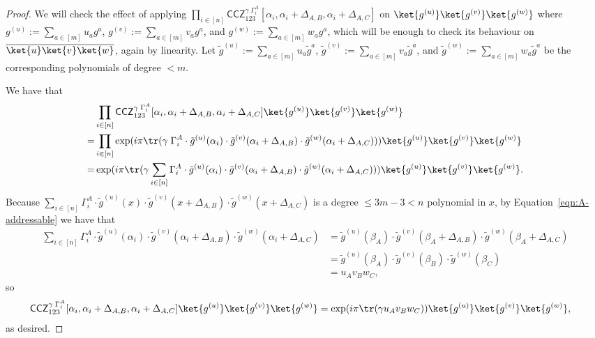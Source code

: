 \documentclass[11pt]{article}
\theoremstyle{definition}
\renewcommand{\le}{\leqslant}
\newcommand{\CCZ}{\mathsf{CCZ}}
\newcommand*{\ol}{\overline}
\begin{document}
\begin{proof}
    We will check the effect of applying $\prod_{i \in [n]}\CCZ_{123}^{\gamma\;\Gamma^A_i}[\alpha_i, \alpha_i + \Delta_{A,B}, \alpha_i + \Delta_{A,C}]$ on $\ket{g^{(u)}}\ket{g^{(v)}}\ket{g^{(w)}}$ where $g^{(u)} := \sum_{a \in [m]} u_a g^a$, $g^{(v)} := \sum_{a \in [m]} v_a g^a$, and $g^{(w)} := \sum_{a \in [m]} w_a g^a$, which will be enough to check its behaviour on $\ol{\ket{u}}\ol{\ket{v}}\ol{\ket{w}}$, again by linearity. Let $\tilde{g}^{(u)} := \sum_{a \in [m]} u_a \tilde{g}^a$, $\tilde{g}^{(v)} := \sum_{a \in [m]} v_a \tilde{g}^a$, and $\tilde{g}^{(w)} := \sum_{a \in [m]} w_a \tilde{g}^a$ be the corresponding polynomials of degree $< m$.

    We have that
    \begin{align}
        &\prod_{i \in [n]}\CCZ_{123}^{\gamma\;\Gamma^A_i}[\alpha_i, \alpha_i + \Delta_{A,B}, \alpha_i + \Delta_{A,C}] \ket{g^{(u)}}\ket{g^{(v)}}\ket{g^{(w)}} \\
        = &\prod_{i \in [n]} \exp({i\pi\tr(\gamma\;\Gamma^A_i \cdot \tilde{g}^{(u)}(\alpha_i) \cdot \tilde{g}^{(v)}(\alpha_i + \Delta_{A,B}) \cdot \tilde{g}^{(w)}(\alpha_i + \Delta_{A,C}) )}) \ket{g^{(u)}}\ket{g^{(v)}}\ket{g^{(w)}} \\
        = &\exp({i\pi\tr(\gamma\sum_{i \in [n]} \Gamma^A_i \cdot \tilde{g}^{(u)}(\alpha_i) \cdot \tilde{g}^{(v)}(\alpha_i + \Delta_{A,B}) \cdot \tilde{g}^{(w)}(\alpha_i + \Delta_{A,C}) )}) \ket{g^{(u)}}\ket{g^{(v)}}\ket{g^{(w)}}.
    \end{align}
Because $\sum_{i \in [n]} \Gamma^A_i \cdot \tilde{g}^{(u)}(x) \cdot \tilde{g}^{(v)}(x + \Delta_{A,B}) \cdot \tilde{g}^{(w)}(x + \Delta_{A,C})$ is a degree $\le 3m-3 < n$ polynomial in $x$, by Equation~\eqref{eqn:A-addressable} we have that 
\begin{align}
    \sum_{i \in [n]} \Gamma^A_i \cdot \tilde{g}^{(u)}(\alpha_i) \cdot \tilde{g}^{(v)}(\alpha_i + \Delta_{A,B}) \cdot \tilde{g}^{(w)}(\alpha_i + \Delta_{A,C})
    &= \tilde{g}^{(u)}(\beta_A) \cdot \tilde{g}^{(v)}(\beta_A + \Delta_{A,B}) \cdot \tilde{g}^{(w)}(\beta_A + \Delta_{A,C}) \\
    &= \tilde{g}^{(u)}(\beta_A) \cdot \tilde{g}^{(v)}(\beta_B) \cdot \tilde{g}^{(w)}(\beta_C) \\
    &= u_A v_B w_C,
\end{align}
so 
\begin{align}
    \CCZ_{123}^{\gamma\;\Gamma^A_i}[\alpha_i, \alpha_i + \Delta_{A,B}, \alpha_i + \Delta_{A,C}] \ket{g^{(u)}}\ket{g^{(v)}}\ket{g^{(w)}}
    &= \exp({i\pi\tr(\gamma u_A v_B w_C)}) \ket{g^{(u)}}\ket{g^{(v)}}\ket{g^{(w)}},
\end{align}
as desired.
\end{proof}
\end{document}
